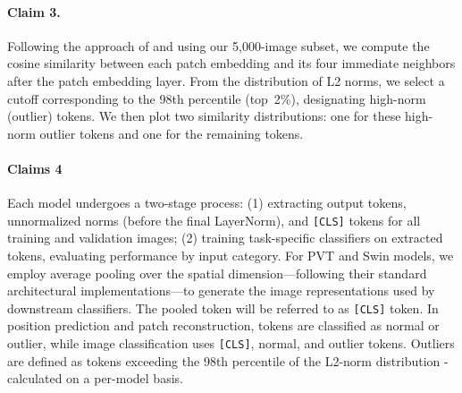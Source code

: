 \documentclass[10pt]{article} \usepackage[preprint]{tmlr}
\begin{document}
\paragraph{Claim 3.}
Following the approach of \citet{darcet2024registers} and using our 5,000-image subset, we compute the cosine similarity between each patch embedding and its four immediate neighbors after the patch embedding layer. From the distribution of L2 norms, we select a cutoff corresponding to the 98th percentile (top~2\%), designating high-norm (outlier) tokens. We then plot two similarity distributions: one for these high-norm outlier tokens and one for the remaining tokens.

\paragraph{Claims 4}
Each model undergoes a two-stage process: (1) extracting output tokens, unnormalized norms (before the final LayerNorm), and \texttt{[CLS]} tokens for all training and validation images; (2) training task-specific classifiers on extracted tokens, evaluating performance by input category. For PVT \citep{wang2022pvt} and Swin \citep{liu2021swin} models, we employ average pooling over the spatial dimension—following their standard architectural implementations—to generate the image representations used by downstream classifiers. The pooled token will be referred to as \texttt{[CLS]} token. In position prediction and patch reconstruction, tokens are classified as normal or outlier, while image classification uses \texttt{[CLS]}, normal, and outlier tokens. Outliers are defined as tokens exceeding the 98th percentile of the L2-norm distribution - calculated on a per-model basis.
\end{document}
